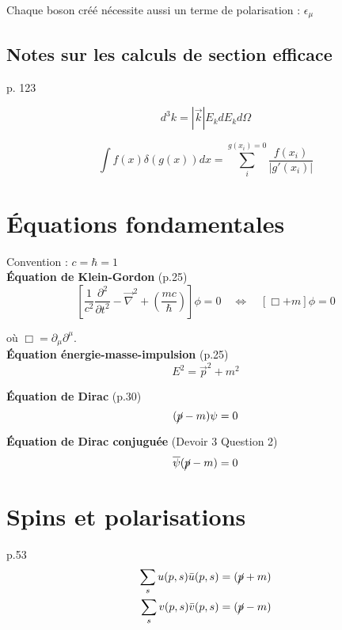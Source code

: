 \documentclass[12pt]{article}
\begin{document}
\hfill \break
Chaque boson créé nécessite aussi un terme de polarisation : $\epsilon_\mu$

\subsection{Notes sur les calculs de section efficace}

p. 123

\begin{equation}
  d^3 k = |\vec{k}| E_k dE_k d\Omega
\end{equation}

\begin{equation}
  \int f(x) \delta(g(x)) dx = \sum_i^{g(x_i)=0} \frac{f(x_i)}{|g'(x_i)|}
\end{equation}

\section{Équations fondamentales}
Convention : $c=\hbar=1$ \\

\textbf{Équation de Klein-Gordon} (p.25)
\begin{equation}
    \left[\frac{1}{c^2}\frac{\partial^2}{\partial t^2} - \Vec{\nabla}^2 + \left(\frac{mc}{\hbar}\right)\right]\phi = 0 \quad \iff \quad [\Box + m] \phi = 0
\end{equation}

où $\Box = \partial_\mu\partial^\mu$.\\

\textbf{Équation énergie-masse-impulsion} (p.25)
\begin{equation}
    E^2 = \Vec{p}^2 + m^2
\end{equation}

\textbf{Équation de Dirac} (p.30)
\begin{equation}
    (\cancel{p} -m )\psi = 0
\end{equation}

\textbf{Équation de Dirac conjuguée} (Devoir 3 Question 2)
\begin{equation}
    \overline{\psi}(\cancel{p} -m ) = 0
\end{equation}


\section{Spins et polarisations}
p.53
\begin{align}
    \sum_s u(p,s)\Bar{u}(p,s) &= (\cancel{p}+m)\\
    \sum_s v(p,s)\Bar{v}(p,s) &= (\cancel{p}-m)
\end{align}
\end{document}
